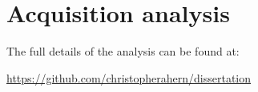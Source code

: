    
\chapter{Acquisition analysis}

The full details of the analysis can be found at:

 \url{https://github.com/christopherahern/dissertation}